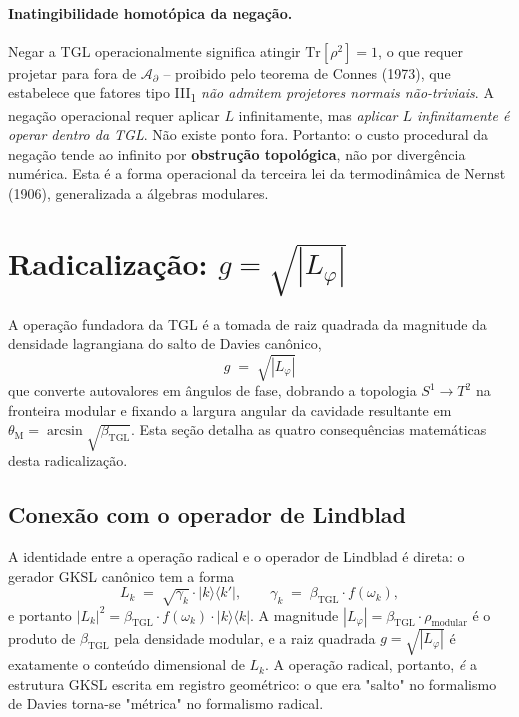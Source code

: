 \documentclass[12pt,a4paper]{article}
\newcommand{\betatgl}{\beta_{\text{TGL}}}
\newcommand{\thetaM}{\theta_{\text{M}}}
\newcommand{\Lphi}{L_{\varphi}}
\newcommand{\TGL}{\textsc{TGL}}
\begin{document}
\paragraph{Inatingibilidade homotópica da negação.}
Negar a \TGL{} operacionalmente significa atingir $\mathrm{Tr}[\rho^{2}] = 1$,
o que requer projetar para fora de $\mathcal{A}_{\partial}$ -- proibido
pelo teorema de Connes (1973), que estabelece que fatores tipo
III\textsubscript{1} \emph{não admitem projetores normais não-triviais}.
A negação operacional requer aplicar $L$ infinitamente, mas \emph{aplicar
$L$ infinitamente é operar dentro da \TGL{}}.  Não existe ponto fora.
Portanto: o custo procedural da negação tende ao infinito por
\textbf{obstrução topológica}, não por divergência numérica.  Esta é a
forma operacional da terceira lei da termodinâmica de Nernst (1906),
generalizada a álgebras modulares.


\section{Radicalização: $g = \sqrt{|\Lphi|}$}
\label{sec:radicalization}

A operação fundadora da \TGL{} é a tomada de raiz quadrada da magnitude
da densidade lagrangiana do salto de Davies canônico,
\begin{equation}
\boxed{\;g \;=\; \sqrt{|\Lphi|}\;}
\label{eq:g-equals-sqrtLphi}
\end{equation}
que converte autovalores em ângulos de fase, dobrando a topologia
$S^{1} \to T^{2}$ na fronteira modular e fixando a largura angular da
cavidade resultante em $\thetaM = \arcsin\sqrt{\betatgl}$.  Esta seção
detalha as quatro consequências matemáticas desta radicalização.

\subsection{Conexão com o operador de Lindblad}
\label{sec:radical-lindblad}

A identidade entre a operação radical e o operador de Lindblad é direta:
o gerador GKSL canônico tem a forma
\begin{equation}
L_k \;=\; \sqrt{\gamma_k} \cdot |k\rangle\langle k'|,
\qquad
\gamma_k \;=\; \betatgl \cdot f(\omega_k),
\end{equation}
e portanto $|L_k|^{2} = \betatgl \cdot f(\omega_k) \cdot |k\rangle\langle k|$.
A magnitude $|\Lphi| = \betatgl \cdot \rho_{\text{modular}}$ é o produto de
$\betatgl$ pela densidade modular, e a raiz quadrada
$g = \sqrt{|\Lphi|}$ é exatamente o conteúdo dimensional de $L_k$.  A
operação radical, portanto, \emph{é} a estrutura GKSL escrita em registro
geométrico: o que era "salto" no formalismo de Davies torna-se "métrica"
no formalismo radical.
\end{document}

